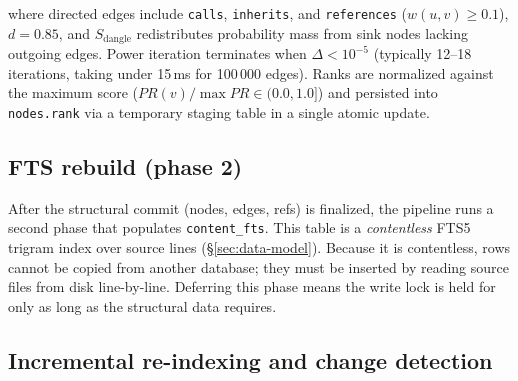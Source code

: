 where directed edges include \texttt{calls}, \texttt{inherits}, and
\texttt{references} ($w(u,v) \ge 0.1$), $d = 0.85$, and $S_{\text{dangle}}$
redistributes probability mass from sink nodes lacking outgoing edges. Power
iteration terminates when $\Delta < 10^{-5}$ (typically 12--18 iterations,
taking under 15\,ms for 100\,000 edges). Ranks are normalized against the
maximum score ($PR(v) / \max PR \in (0.0, 1.0]$) and persisted into
\texttt{nodes.rank} via a temporary staging table in a single atomic update.

\subsection{FTS rebuild (phase 2)}

After the structural commit (nodes, edges, refs) is finalized, the pipeline
runs a second phase that populates \texttt{content\_fts}. This table is a
\emph{contentless} FTS5 trigram index over source lines
(\S\ref{sec:data-model}). Because it is contentless, rows cannot be copied
from another database; they must be inserted by reading source files from
disk line-by-line. Deferring this phase means the write lock is held for only
as long as the structural data requires.

\subsection{Incremental re-indexing and change detection}
\label{sec:incremental-reindexing}

